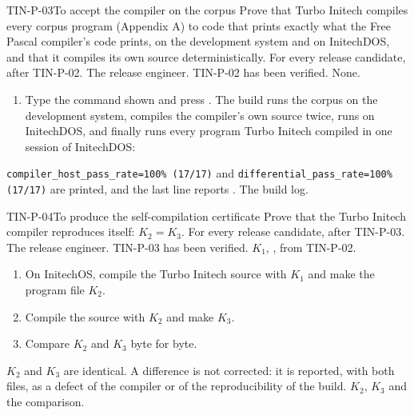 \begin{AcceptanceProcedure}{TIN-P-03}{To accept the compiler on the corpus}
Prove that Turbo Initech compiles every corpus program
(Appendix A) to code that prints exactly what the Free Pascal compiler's
code prints, on the development system and on InitechDOS, and that it
compiles its own source deterministically.
For every release candidate, after TIN-P-02.
The release engineer.
TIN-P-02 has been verified.
None.
\begin{enumerate}
\item Type the command shown and press .  The build runs the
  corpus on the development system, compiles the compiler's own source
  twice, runs  on InitechDOS, and finally runs every
  program Turbo Initech compiled in one session of InitechDOS:
\end{enumerate}
\texttt{compiler\_host\_pass\_rate=100\% (17/17)} and
\texttt{differential\_pass\_rate=100\% (17/17)} are printed, and the last line
reports .
The build log.
\end{AcceptanceProcedure}

\begin{AcceptanceProcedure}{TIN-P-04}{To produce the self-compilation certificate}
Prove that the Turbo Initech compiler reproduces itself:
$K_2 = K_3$.
For every release candidate, after TIN-P-03.
The release engineer.
TIN-P-03 has been verified.
$K_1$, , from TIN-P-02.
\begin{enumerate}
\item On InitechOS, compile the Turbo Initech source with $K_1$ and make the
  program file $K_2$.
\item Compile the source with $K_2$ and make $K_3$.
\item Compare $K_2$ and $K_3$ byte for byte.
\end{enumerate}
$K_2$ and $K_3$ are identical.  A difference is not
corrected: it is reported, with both files, as a defect of the compiler or
of the reproducibility of the build.
$K_2$, $K_3$ and the comparison.
\end{AcceptanceProcedure}

